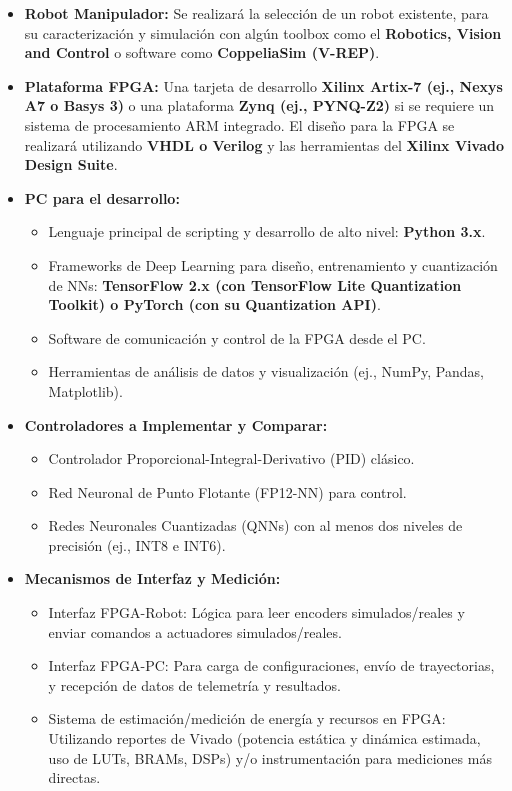 \documentclass[12pt]{article}
\begin{document}
\begin{itemize}
    \item \textbf{Robot Manipulador:} Se realizará la selección de un robot existente, para su caracterización y simulación con algún toolbox como el \textbf{Robotics, Vision and Control} o software como \textbf{CoppeliaSim (V-REP)}.
    \item \textbf{Plataforma FPGA:} Una tarjeta de desarrollo \textbf{Xilinx Artix-7 (ej., Nexys A7 o Basys 3)} o una plataforma \textbf{Zynq (ej., PYNQ-Z2)} si se requiere un sistema de procesamiento ARM integrado. El diseño para la FPGA se realizará utilizando \textbf{VHDL o Verilog} y las herramientas del \textbf{Xilinx Vivado Design Suite}.
    \item \textbf{PC para el desarrollo:}
        \begin{itemize}
            \item Lenguaje principal de scripting y desarrollo de alto nivel: \textbf{Python 3.x}.
            \item Frameworks de Deep Learning para diseño, entrenamiento y cuantización de NNs: \textbf{TensorFlow 2.x (con TensorFlow Lite Quantization Toolkit) o PyTorch (con su Quantization API)}.
            \item Software de comunicación y control de la FPGA desde el PC.
            \item Herramientas de análisis de datos y visualización (ej., NumPy, Pandas, Matplotlib).
        \end{itemize}
    \item \textbf{Controladores a Implementar y Comparar:}
        \begin{itemize}
            \item Controlador Proporcional-Integral-Derivativo (PID) clásico.
            \item Red Neuronal de Punto Flotante (FP12-NN) para control.
            \item Redes Neuronales Cuantizadas (QNNs) con al menos dos niveles de precisión (ej., INT8 e INT6).
        \end{itemize}
    \item \textbf{Mecanismos de Interfaz y Medición:}
        \begin{itemize}
            \item Interfaz FPGA-Robot: Lógica para leer encoders simulados/reales y enviar comandos a actuadores simulados/reales.
            \item Interfaz FPGA-PC: Para carga de configuraciones, envío de trayectorias, y recepción de datos de telemetría y resultados.
            \item Sistema de estimación/medición de energía y recursos en FPGA: Utilizando reportes de Vivado (potencia estática y dinámica estimada, uso de LUTs, BRAMs, DSPs) y/o instrumentación para mediciones más directas.
        \end{itemize}
\end{itemize}
\end{document}
